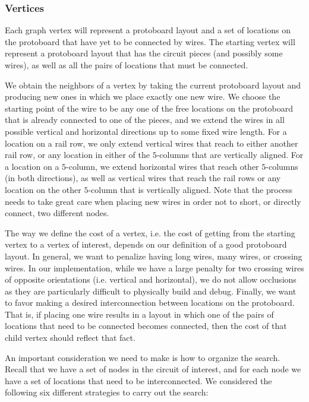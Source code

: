 \subsubsection{Vertices}

Each graph vertex will represent a protoboard layout and a set of locations on
the protoboard that have yet to be connected by wires. The starting vertex will
represent a protoboard layout that has the circuit pieces (and possibly some
wires), as well as all the pairs of locations that must be connected.

We obtain the neighbors of a vertex by taking the current protoboard layout and
producing new ones in which we place exactly one new wire. We
choose the starting point of the wire to be any one of the free locations on the
protoboard that is already connected to one of the pieces, and we extend the
wires in all possible vertical and horizontal directions up to some fixed wire
length. For a location on a rail row, we only extend vertical wires that reach
to either another rail row, or any location in either of the $5$-columns that
are vertically aligned.
For a location on a $5$-column, we extend horizontal wires that reach other
$5$-columns (in both directions), as well as
vertical wires that reach the rail rows or any location on the other
$5$-column that is vertically aligned.
Note that the process needs
to take great care when placing new wires in order not to short, or directly
connect, two different nodes.

The way we define the cost of a vertex, i.e. the cost of getting from the
starting vertex to a vertex of interest, depends on our definition of a good
protoboard layout. In general, we want to penalize having
long wires, many wires, or crossing wires. In our implementation, while we have
a large penalty for two crossing wires of opposite orientations (i.e. vertical
and horizontal), we do not allow occlusions as
they are particularly difficult to physically build and debug.
Finally, we want to favor making a desired interconnection between locations
on the protoboard. That is, if placing one wire results in a layout in which
one of the pairs of locations that need to be connected becomes connected, then
the cost of that child vertex should reflect that fact.

An important consideration we need to make is how to organize the
search. Recall that we have a set of nodes in the circuit of interest, and for
each node we have a set of locations that need to be interconnected.
We considered the following six different strategies to carry out the search:

